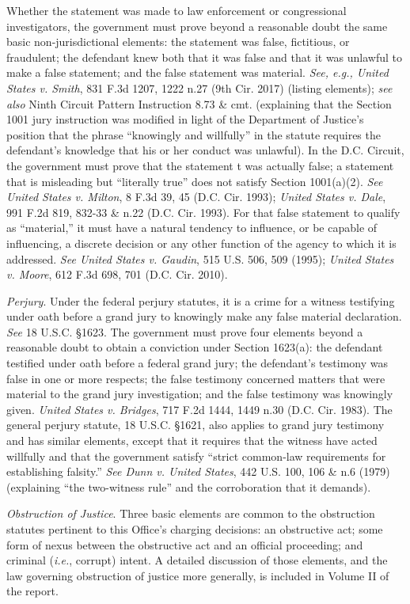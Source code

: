 Whether the statement was made to law enforcement or congressional investigators, the government must prove beyond a reasonable doubt the same basic non-jurisdictional elements: the statement was false, fictitious, or fraudulent; the defendant knew both that it was false and that it was unlawful to make a false statement; and the false statement was material.
\textit{See, e.g., United States v. Smith}, 831 F.3d 1207, 1222 n.27 (9th Cir. 2017) (listing elements); \textit{see also} Ninth Circuit Pattern Instruction 8.73 \& cmt. (explaining that the Section 1001 jury instruction was modified in light of the Department of Justice's position that the phrase ``knowingly and willfully'' in the statute requires the defendant's knowledge that his or her conduct was unlawful).
In the D.C. Circuit, the government must prove that the statement t was actually false; a statement that is misleading but ``literally true'' does not satisfy Section 1001(a)(2).
\textit{See United States v. Milton}, 8 F.3d 39, 45 (D.C. Cir. 1993); \textit{United States v. Dale}, 991 F.2d 819, 832-33 \& n.22 (D.C. Cir. 1993).
For that false statement to qualify as ``material,'' it must have a natural tendency to influence, or be capable of influencing, a discrete decision or any other function of the agency to which it is addressed.
\textit{See United States v. Gaudin}, 515 U.S. 506, 509 (1995); \textit{United States v. Moore}, 612 F.3d 698, 701 (D.C. Cir. 2010).

\textit{Perjury}.
Under the federal perjury statutes, it is a crime for a witness testifying under oath before a grand jury to knowingly make any false material declaration.
\textit{See} 18 U.S.C. \S 1623.
The government must prove four elements beyond a reasonable doubt to obtain a conviction under Section 1623(a): the defendant testified under oath before a federal grand jury; the defendant's testimony was false in one or more respects; the false testimony concerned matters that were material to the grand jury investigation; and the false testimony was knowingly given.
\textit{United States v. Bridges}, 717 F.2d 1444, 1449 n.30 (D.C. Cir. 1983).
The general perjury statute, 18 U.S.C. \S 1621, also applies to grand jury testimony and has similar elements, except that it requires that the witness have acted willfully and that the government satisfy ``strict common-law requirements for establishing falsity.''
\textit{See Dunn v. United States}, 442 U.S. 100, 106 \& n.6 (1979) (explaining ``the two-witness rule'' and the corroboration that it demands).

\textit{Obstruction of Justice}.
Three basic elements are common to the obstruction statutes pertinent to this Office's charging decisions: an obstructive act; some form of nexus between the obstructive act and an official proceeding; and criminal (\textit{i.e.}, corrupt) intent.
A detailed discussion of those elements, and the law governing obstruction of justice more generally, is included in Volume II of the report.

